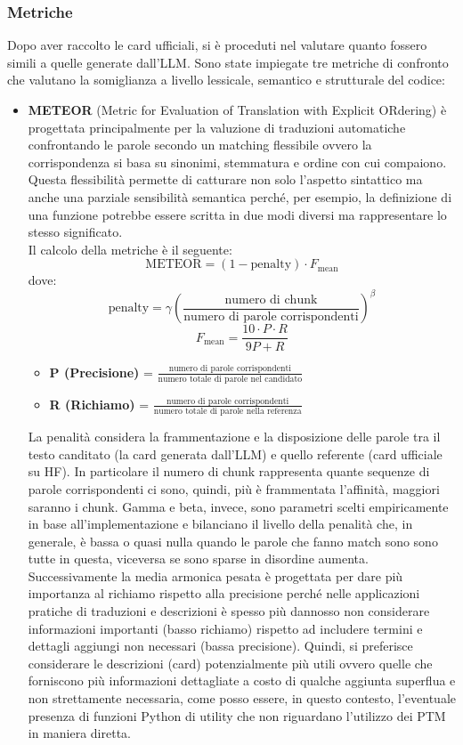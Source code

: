 \documentclass{article}
\begin{document}
\subsubsection{Metriche}
Dopo aver raccolto le card ufficiali, si è proceduti nel valutare quanto fossero simili a quelle generate dall'LLM. Sono state impiegate tre metriche di confronto che valutano la somiglianza a livello lessicale, semantico e strutturale del codice:
\begin{itemize}
    \item \textbf{METEOR} (Metric for Evaluation of Translation with Explicit ORdering) \cite{banerjee2005meteor} è progettata principalmente per la valuzione di traduzioni automatiche confrontando le parole secondo un matching flessibile ovvero la corrispondenza si basa su sinonimi, stemmatura e ordine con cui compaiono. Questa flessibilità permette di catturare non solo l'aspetto sintattico ma anche una parziale sensibilità semantica perché, per esempio, la definizione di una funzione potrebbe essere scritta in due modi diversi ma rappresentare lo stesso significato.\\
    Il calcolo della metriche è il seguente:
    \[
    \text{METEOR} = (1 - \text{penalty}) \cdot F_{\text{mean}}
    \]
    dove:
    \[
        \text{penalty} = \gamma \left( \frac{\text{numero di chunk}}{\text{numero di parole corrispondenti}} \right)^\beta
    \]
    \[
        F_{\text{mean}} = \frac{10 \cdot P \cdot R}{9P + R}
    \]
    \begin{itemize}
        \item \textbf{P (Precisione)} = $\frac{\text{numero di parole corrispondenti}}{\text{numero totale di parole nel candidato}}$
        \item \textbf{R (Richiamo)} = $\frac{\text{numero di parole corrispondenti}}{\text{numero totale di parole nella referenza}}$
    \end{itemize}
    La penalità considera la frammentazione e la disposizione delle parole tra il testo canditato (la card generata dall'LLM) e quello referente (card ufficiale su HF). In particolare il numero di chunk rappresenta quante sequenze di parole corrispondenti ci sono, quindi, più è frammentata l'affinità, maggiori saranno i chunk. Gamma e beta, invece, sono parametri scelti empiricamente in base all'implementazione e bilanciano il livello della penalità che, in generale, è bassa o quasi nulla quando le parole che fanno match sono sono tutte in questa, viceversa se sono sparse in disordine aumenta.\\
    Successivamente la media armonica pesata è progettata per dare più importanza al richiamo rispetto alla precisione perché nelle applicazioni pratiche di traduzioni e descrizioni è spesso più dannosso non considerare informazioni importanti (basso richiamo) rispetto ad includere termini e dettagli aggiungi non necessari (bassa precisione). Quindi, si preferisce considerare le descrizioni (card) potenzialmente più utili ovvero quelle che forniscono più informazioni dettagliate a costo di qualche aggiunta superflua e non strettamente necessaria, come posso essere, in questo contesto, l'eventuale presenza di funzioni Python di utility che non riguardano l'utilizzo dei PTM in maniera diretta.\\

\end{itemize}
\end{document}
